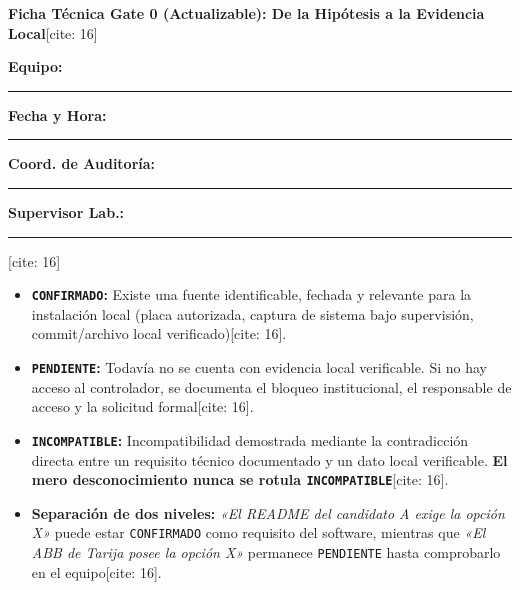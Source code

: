 \documentclass[10pt, a4paper, landscape]{article}
\begin{document}
\begin{center}
    \Large\textbf{\textcolor{ucbblue}{Ficha Técnica Gate 0 (Actualizable): De la Hipótesis a la Evidencia Local}}[cite: 16]
\end{center}

\vspace{0.1cm}
\noindent
\textbf{Equipo:} \rule{3.5cm}{0.15mm} \hfill
\textbf{Fecha y Hora:} \rule{4cm}{0.15mm} \hfill
\textbf{Coord. de Auditoría:} \rule{4.5cm}{0.15mm} \hfill
\textbf{Supervisor Lab.:} \rule{4.5cm}{0.15mm}[cite: 16]

\vspace{0.15cm}
\begin{tcolorbox}[colback=yellow!10, colframe=black, title=\textbf{Convención de Evidencia y Reglas de Clasificación (Bloque A)} {[cite: 16]}, left=2mm, right=2mm, top=1mm, bottom=1mm]
    \scriptsize\raggedright
    \begin{itemize}
        \item \textbf{\texttt{CONFIRMADO}:} Existe una fuente identificable, fechada y relevante para la instalación local (placa autorizada, captura de sistema bajo supervisión, commit/archivo local verificado)[cite: 16].
        \item \textbf{\texttt{PENDIENTE}:} Todavía no se cuenta con evidencia local verificable. Si no hay acceso al controlador, se documenta el bloqueo institucional, el responsable de acceso y la solicitud formal[cite: 16].
        \item \textbf{\texttt{INCOMPATIBLE}:} Incompatibilidad demostrada mediante la contradicción directa entre un requisito técnico documentado y un dato local verificable. \textbf{El mero desconocimiento nunca se rotula \texttt{INCOMPATIBLE}}[cite: 16].
        \item \textbf{Separación de dos niveles:} \textit{«El README del candidato A exige la opción X»} puede estar \texttt{CONFIRMADO} como requisito del software, mientras que \textit{«El ABB de Tarija posee la opción X»} permanece \texttt{PENDIENTE} hasta comprobarlo en el equipo[cite: 16].
    \end{itemize}
\end{tcolorbox}
\end{document}
